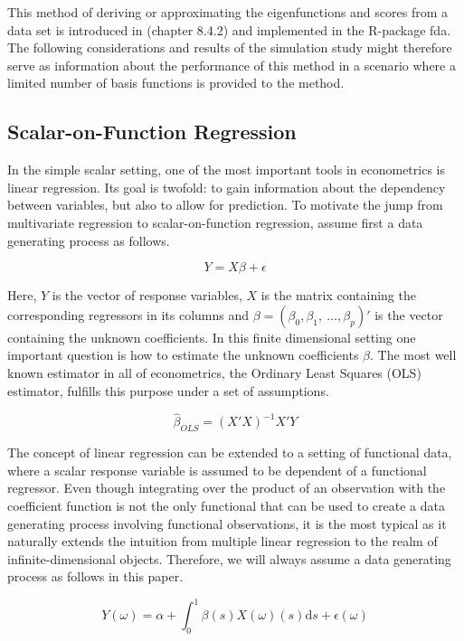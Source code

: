 \documentclass[11pt,twoside,a4paper]{article}
\begin{document}
	This method of deriving or approximating the eigenfunctions and scores from a data set is introduced in \cite{ramsay_functional_2005} (chapter 8.4.2) and implemented in the R-package fda. The following considerations and results of the simulation study might therefore serve as information about the performance of this method in a scenario where a limited number of basis functions is provided to the method.
	
	\subsection{Scalar-on-Function Regression}
	In the simple scalar setting, one of the most important tools in econometrics is linear regression. Its goal is twofold: to gain information about the dependency between variables, but also to allow for prediction. To motivate the jump from multivariate regression to scalar-on-function regression, assume first a data generating process as follows.
	
	\begin{equation}
		Y = X\beta + \epsilon
	\end{equation}
	
	Here, $Y$ is the vector of response variables, $X$ is the matrix containing the corresponding regressors in its columns and $\beta = (\beta_0, \beta_1, \: \dots, \beta_p)'$ is the vector containing the unknown coefficients.
	In this finite dimensional setting one important question is how to estimate the unknown coefficients $\beta$. The most well known estimator in all of econometrics, the Ordinary Least Squares (OLS) estimator, fulfills this purpose under a set of assumptions.
	
	\begin{equation}
		\hat{\beta}_{OLS} = (X'X)^{-1}X'Y
	\end{equation}
	
	The concept of linear regression can be extended to a setting of functional data, where a scalar response variable is assumed to be dependent of a functional regressor. 
	Even though integrating over the product of an observation with the coefficient function is not the only functional that can be used to create a data generating process involving functional observations, it is the most typical as it naturally extends the intuition from multiple linear regression to the realm of infinite-dimensional objects. Therefore, we will always assume a data generating process as follows in this paper.
	
	\begin{equation}\label{DGP}
		Y(\omega) = \alpha + \int_{0}^{1} \beta(s)X(\omega)(s) \mathrm{d}s + \epsilon(\omega)
	\end{equation}
	
\end{document}
